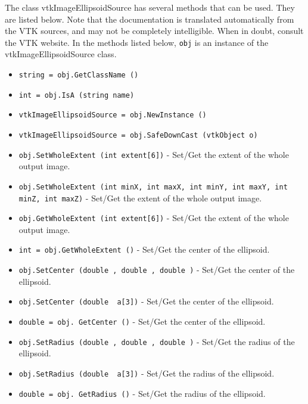 The class vtkImageEllipsoidSource has several methods that can be used.
  They are listed below.
Note that the documentation is translated automatically from the VTK sources,
and may not be completely intelligible.  When in doubt, consult the VTK website.
In the methods listed below, \verb|obj| is an instance of the vtkImageEllipsoidSource class.
\begin{itemize}
\item  \verb|string = obj.GetClassName ()|

\item  \verb|int = obj.IsA (string name)|

\item  \verb|vtkImageEllipsoidSource = obj.NewInstance ()|

\item  \verb|vtkImageEllipsoidSource = obj.SafeDownCast (vtkObject o)|

\item  \verb|obj.SetWholeExtent (int extent[6])| -  Set/Get the extent of the whole output image.

\item  \verb|obj.SetWholeExtent (int minX, int maxX, int minY, int maxY, int minZ, int maxZ)| -  Set/Get the extent of the whole output image.

\item  \verb|obj.GetWholeExtent (int extent[6])| -  Set/Get the extent of the whole output image.

\item  \verb|int = obj.GetWholeExtent ()| -  Set/Get the center of the ellipsoid.

\item  \verb|obj.SetCenter (double , double , double )| -  Set/Get the center of the ellipsoid.

\item  \verb|obj.SetCenter (double  a[3])| -  Set/Get the center of the ellipsoid.

\item  \verb|double = obj. GetCenter ()| -  Set/Get the center of the ellipsoid.

\item  \verb|obj.SetRadius (double , double , double )| -  Set/Get the radius of the ellipsoid.

\item  \verb|obj.SetRadius (double  a[3])| -  Set/Get the radius of the ellipsoid.

\item  \verb|double = obj. GetRadius ()| -  Set/Get the radius of the ellipsoid.


\end{itemize}
